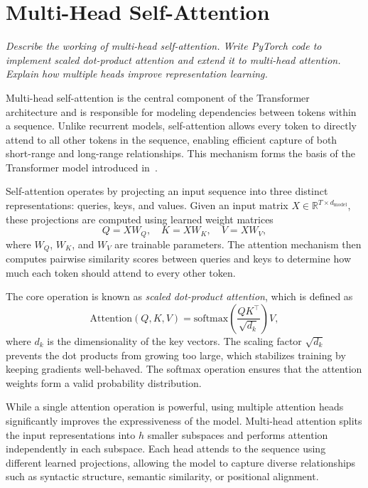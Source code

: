 \section{Multi-Head Self-Attention}\label{sec:multi_self_attention}
\textit{Describe the working of multi-head self-attention. Write PyTorch code to implement
scaled dot-product attention and extend it to multi-head attention. Explain how
multiple heads improve representation learning.}

Multi-head self-attention is the central component of the
Transformer architecture and is responsible for modeling
dependencies between tokens within a sequence.
Unlike recurrent models, self-attention allows every token
to directly attend to all other tokens in the sequence,
enabling efficient capture of both short-range and long-range
relationships.
This mechanism forms the basis of the Transformer model
introduced in~\cite{vaswaniAttentionAllYou2017}.

Self-attention operates by projecting an input sequence into
three distinct representations: queries, keys, and values.
Given an input matrix
$X \in \mathbb{R}^{T \times d_{\text{model}}}$, these projections
are computed using learned weight matrices
\begin{equation}
Q = XW_Q, \quad K = XW_K, \quad V = XW_V,
\end{equation}
where $W_Q$, $W_K$, and $W_V$ are trainable parameters.
The attention mechanism then computes pairwise similarity
scores between queries and keys to determine how much
each token should attend to every other token.

The core operation is known as \emph{scaled dot-product
attention}, which is defined as
\begin{equation}
\text{Attention}(Q, K, V) =
\text{softmax}\left(\frac{QK^\top}{\sqrt{d_k}}\right)V,
\end{equation}
where $d_k$ is the dimensionality of the key vectors.
The scaling factor $\sqrt{d_k}$ prevents the dot products
from growing too large, which stabilizes training by
keeping gradients well-behaved.
The softmax operation ensures that the attention weights
form a valid probability distribution.

While a single attention operation is powerful, using
multiple attention heads significantly improves the
expressiveness of the model.
Multi-head attention splits the input representations
into $h$ smaller subspaces and performs attention
independently in each subspace.
Each head attends to the sequence using different learned
projections, allowing the model to capture diverse
relationships such as syntactic structure, semantic
similarity, or positional alignment.

